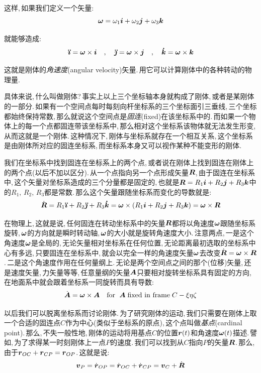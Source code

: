 这样,\,如果我们定义一个矢量:
\[\boldsymbol{\omega}=\omega_1\boldsymbol{i}+\omega_2\boldsymbol{j}+\omega_3\boldsymbol{k}\]

就能够造成:
\[\boldsymbol{\ddot{\imath}}=\boldsymbol{\omega}\times \boldsymbol{i}\quad ,\quad \boldsymbol{\ddot{\jmath}}=\boldsymbol{\omega}\times \boldsymbol{j}\quad ,\quad \boldsymbol{\dot{k}}=\boldsymbol{\omega}\times \boldsymbol{k}\]

这就是刚体的\emph{角速度}(angular velocity)矢量.\,用它可以计算刚体中的各种转动的物理量.

具体来说,\,什么叫做刚体?\,事实上以上三个坐标轴本身就构成了刚体,\,或者是某刚体的一部分.\,如果有一个空间点每时每刻向杆坐标系的三个坐标面引三垂线,\,三个坐标都始终保持常数,\,那么就说这个空间点是\emph{固连}(fixed)在该坐标系中的.\,而如果一个物体上的每一个点都固连带该坐标系中,\,那么相对这个坐标系该物体就无法发生形变,\,从而这就是一个刚体.\,这种情况下,\,刚体与坐标系就存在一个相互关系,\,这个坐标系是由刚体所对应的固连坐标系,\,而坐标系本身又可以视作某种不能变形的刚体.

我们在坐标系中找到固连在坐标系上的两个点,\,或者说在刚体上找到固连在刚体上的两个点(以后不加以区分).\,从一个点指向另一个点形成矢量$\boldsymbol{R}$,\,由于固连在坐标系中,\,这个矢量对坐标系造成的三个分量都是固定的,\,也就是$\boldsymbol{R}=R_1\boldsymbol{i}+R_2\boldsymbol{j}+R_3\boldsymbol{k}$中的$R_1,\,R_2,\,R_3$都是常数.\,那么这个矢量跟随坐标系而变化的导数就是:
\[\dot{\boldsymbol{R}}=R_1\boldsymbol{\ddot{\imath}}+R_2\boldsymbol{\ddot{\jmath}}+R_3\boldsymbol{\dot{k}}=\boldsymbol{\omega}\times(R_1\boldsymbol{i}+R_2\boldsymbol{j}+R_3\boldsymbol{k})=\boldsymbol{\omega}\times\boldsymbol{R}\]

在物理上,\,这就是说,\,任何固连在转动坐标系中的矢量$\boldsymbol{R}$都将以角速度$\boldsymbol{\omega}$跟随坐标系旋转,\,$\boldsymbol{\omega}$的方向就是瞬时转动轴,\,$\boldsymbol{\omega}$的大小就是旋转角速度大小.\,注意两点,\,一是这个角速度$\boldsymbol{\omega}$是全局的,\,无论矢量相对坐标系在任何位置,\,无论距离最初选取的坐标系中心有多远,\,只要固连在坐标系中,\,就会以完全一样的角速度矢量$\boldsymbol{\omega}$去改变$\dot{\boldsymbol{R}}=\boldsymbol{\omega}\times\boldsymbol{R}$.\,二是这个角速度作用在任何量纲上.\,无论是两个空间点之间的那个(位移)矢量,\,还是速度矢量,\,力矢量等等,\,任意量纲的矢量$\boldsymbol{A}$只要相对旋转坐标系具有固定的方向,\,在地面系中就会跟着坐标系一同旋转而具有导数:
\[\dot{\boldsymbol{A}}=\boldsymbol{\omega}\times\boldsymbol{A}\quad \text{for }\; \boldsymbol{A}\;\text{fixed in frame}\; C-\xi\eta\zeta\]

以后我们可以脱离坐标系而讨论刚体.\,为了研究刚体的运动,\,我们只需要在刚体上取一个合适的固连点$C$作为中心(类似于坐标系的原点),\,这个点叫做\emph{基点}(cardinal point).\,那么,\,不失一般性地,\,刚体的运动将用基点$C$的位置$\boldsymbol{r}(t)$和角速度$\boldsymbol{\omega}(t)$描述.\,譬如,\,为了求得某一时刻刚体上一点$P$的速度.\,我们可以找到从$C$指向$P$的矢量$\boldsymbol{R}$.\,那么,\,由于$\boldsymbol{r}_{OC}+\boldsymbol{r}_{CP}=\boldsymbol{r}_{OP}$.\,这就是说:
\[\boldsymbol{v}_{P}=\dot{\boldsymbol{r}}_{OP}=\dot{\boldsymbol{r}}_{OC}+\dot{\boldsymbol{r}}_{CP}=\boldsymbol{v}_{C}+\dot{\boldsymbol{R}}\]

